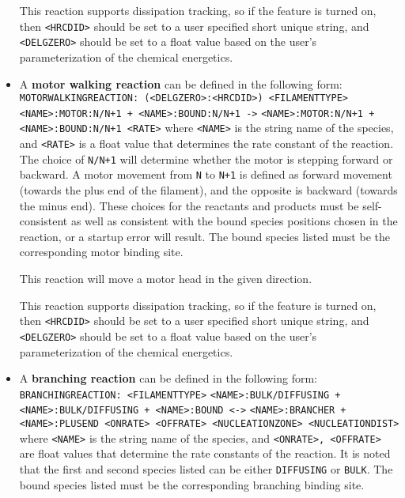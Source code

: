 \documentclass[11pt, oneside]{article}   	%
\begin{document}
\begin{itemize}
	This reaction supports dissipation tracking, so if the feature is turned on, then \texttt{<HRCDID>} should be set to a user specified short unique string, and \texttt{<DELGZERO>} should be set to a float value based on the user's parameterization of the chemical energetics.	
	
	\item A \textbf{motor walking reaction} can be defined in the following form:\newline\newline
	\texttt{MOTORWALKINGREACTION: (<DELGZERO>:<HRCDID>) <FILAMENTTYPE>}\newline
	\texttt{<NAME>:MOTOR:N/N+1 + <NAME>:BOUND:N/N+1 ->}\newline
	\texttt{<NAME>:MOTOR:N/N+1 + <NAME>:BOUND:N/N+1 <RATE>}\newline\newline
	where \texttt{<NAME>} is the string name of the species, and \texttt{<RATE>} is a float value that determines the rate constant of the reaction. The choice of \texttt{N/N+1} will determine whether the motor is stepping forward or backward. A motor movement from \texttt{N} to \texttt{N+1} is defined as forward movement (towards the plus end of the filament), and the opposite is backward (towards the minus end). These choices for the reactants and products must be self-consistent as well as consistent with the bound species positions chosen in the reaction, or a startup error will result. The bound species listed must be the corresponding motor binding site.
	
	This reaction will move a motor head in the given direction.
	
	This reaction supports dissipation tracking, so if the feature is turned on, then \texttt{<HRCDID>} should be set to a user specified short unique string, and \texttt{<DELGZERO>} should be set to a float value based on the user's parameterization of the chemical energetics.
	
	\item A \textbf{branching reaction} can be defined in the following form:\newline\newline
	\texttt{BRANCHINGREACTION:  <FILAMENTTYPE>}\newline
	\texttt{<NAME>:BULK/DIFFUSING + <NAME>:BULK/DIFFUSING +  <NAME>:BOUND <->}\newline
	\texttt{<NAME>:BRANCHER + <NAME>:PLUSEND <ONRATE> <OFFRATE> <NUCLEATIONZONE> <NUCLEATIONDIST>}\newline\newline
	where \texttt{<NAME>} is the string name of the species, and \texttt{<ONRATE>, <OFFRATE>} are float values that determine the rate constants of the reaction.  It is noted that the first and second species listed can be either \texttt{DIFFUSING} or \texttt{BULK}. The bound species listed must be the corresponding branching binding site.
	

\end{itemize}
\end{document}
